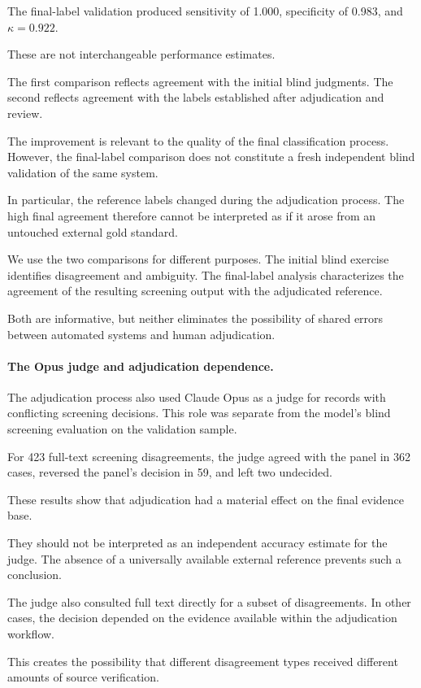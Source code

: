The final-label
validation produced
sensitivity of 1.000,
specificity
of 0.983,
and $\kappa=0.922$.

These are not
interchangeable
performance estimates.

The first comparison
reflects agreement
with the initial
blind judgments.
The second reflects
agreement with
the labels established
after adjudication
and review.

The improvement
is relevant
to the quality
of the final
classification process.
However, the
final-label comparison
does not constitute
a fresh independent
blind validation
of the same
system.

In particular,
the reference
labels changed
during the
adjudication process.
The high final
agreement therefore
cannot be interpreted
as if it arose
from an untouched
external gold
standard.

We use the
two comparisons
for different
purposes.
The initial
blind exercise
identifies disagreement
and ambiguity.
The final-label
analysis characterizes
the agreement
of the resulting
screening output
with the adjudicated
reference.

Both are informative,
but neither
eliminates the
possibility of
shared errors
between automated
systems and
human adjudication.

\paragraph*{The Opus judge and adjudication dependence.}

The adjudication process also used
Claude Opus as a judge
for records with
conflicting screening
decisions.
This role was
separate from
the model's blind
screening evaluation
on the validation sample.

For 423 full-text
screening disagreements,
the judge agreed
with the panel
in 362 cases,
reversed the
panel's decision
in 59,
and left two
undecided.

These results
show that
adjudication had
a material effect
on the final
evidence base.

They should not
be interpreted
as an independent
accuracy estimate
for the judge.
The absence of
a universally
available external
reference prevents
such a conclusion.

The judge also
consulted full text
directly for
a subset of
disagreements.
In other cases,
the decision
depended on
the evidence
available within
the adjudication
workflow.

This creates
the possibility
that different
disagreement types
received different
amounts of
source verification.

